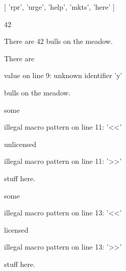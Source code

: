 
[ 'rpr', 'urge', 'help', 'mkts', 'here' ]\mktsShowpar\par
42\mktsShowpar\par
There are 42 bulls on the meadow.\mktsShowpar\par
There are \begin{mktsEnvWarning}value on line 9: unknown identifier 'y'\end{mktsEnvWarning} bulls on the meadow.\mktsShowpar\par
some \begin{mktsEnvWarning}illegal macro pattern on line 11: '<<'\end{mktsEnvWarning} unlicensed \begin{mktsEnvWarning}illegal macro pattern on line 11: '>>'\end{mktsEnvWarning} stuff here.\mktsShowpar\par
some \begin{mktsEnvWarning}illegal macro pattern on line 13: '<<'\end{mktsEnvWarning} licensed \begin{mktsEnvWarning}illegal macro pattern on line 13: '>>'\end{mktsEnvWarning} stuff here.\mktsShowpar\par

